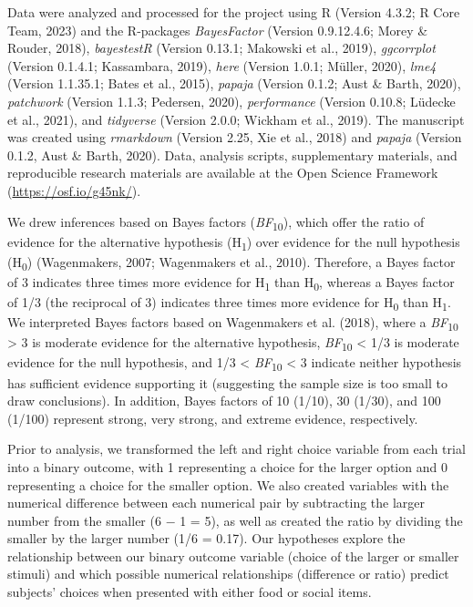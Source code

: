\documentclass[
  ,pub,floatsintext]{apa6}
\begin{document}
Data were analyzed and processed for the project using R (Version 4.3.2; R Core Team, 2023) and the R-packages \emph{BayesFactor} (Version 0.9.12.4.6; Morey \& Rouder, 2018), \emph{bayestestR} (Version 0.13.1; Makowski et al., 2019), \emph{ggcorrplot} (Version 0.1.4.1; Kassambara, 2019), \emph{here} (Version 1.0.1; Müller, 2020), \emph{lme4} (Version 1.1.35.1; Bates et al., 2015), \emph{papaja} (Version 0.1.2; Aust \& Barth, 2020), \emph{patchwork} (Version 1.1.3; Pedersen, 2020), \emph{performance} (Version 0.10.8; Lüdecke et al., 2021), and \emph{tidyverse} (Version 2.0.0; Wickham et al., 2019). The manuscript was created using \emph{rmarkdown} (Version 2.25, Xie et al., 2018) and \emph{papaja} (Version 0.1.2, Aust \& Barth, 2020). Data, analysis scripts, supplementary materials, and reproducible research materials are available at the Open Science Framework (\url{https://osf.io/g45nk/}).

We drew inferences based on Bayes factors (\emph{BF}\textsubscript{10}), which offer the ratio of evidence for the alternative hypothesis (H\textsubscript{1}) over evidence for the null hypothesis (H\textsubscript{0}) (Wagenmakers, 2007; Wagenmakers et al., 2010). Therefore, a Bayes factor of 3 indicates three times more evidence for H\textsubscript{1} than H\textsubscript{0}, whereas a Bayes factor of 1/3 (the reciprocal of 3) indicates three times more evidence for H\textsubscript{0} than H\textsubscript{1}. We interpreted Bayes factors based on Wagenmakers et al. (2018), where a \emph{BF}\textsubscript{10} \textgreater{} 3 is moderate evidence for the alternative hypothesis, \emph{BF}\textsubscript{10} \textless{} 1/3 is moderate evidence for the null hypothesis, and 1/3 \textless{} \emph{BF}\textsubscript{10} \textless{} 3 indicate neither hypothesis has sufficient evidence supporting it (suggesting the sample size is too small to draw conclusions). In addition, Bayes factors of 10 (1/10), 30 (1/30), and 100 (1/100) represent strong, very strong, and extreme evidence, respectively.

Prior to analysis, we transformed the left and right choice variable from each trial into a binary outcome, with 1 representing a choice for the larger option and 0 representing a choice for the smaller option. We also created variables with the numerical difference between each numerical pair by subtracting the larger number from the smaller (6 \(-\) 1 = 5), as well as created the ratio by dividing the smaller by the larger number (1/6 = 0.17). Our hypotheses explore the relationship between our binary outcome variable (choice of the larger or smaller stimuli) and which possible numerical relationships (difference or ratio) predict subjects' choices when presented with either food or social items.
\end{document}
